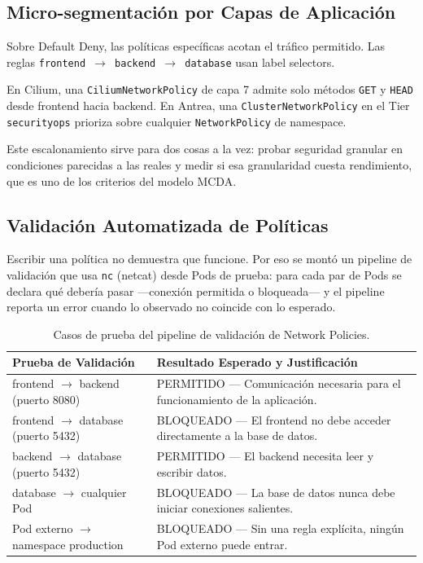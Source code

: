 \subsection{Micro-segmentación por Capas de Aplicación}

Sobre Default Deny, las políticas específicas acotan el tráfico permitido. Las reglas \texttt{frontend $\rightarrow$ backend $\rightarrow$ database} usan label selectors.

En Cilium, una \texttt{CiliumNetworkPolicy} de capa 7 admite solo métodos \texttt{GET} y \texttt{HEAD} desde frontend hacia backend. En Antrea, una \texttt{ClusterNetworkPolicy} en el Tier \texttt{securityops} prioriza sobre cualquier \texttt{NetworkPolicy} de namespace.

Este escalonamiento sirve para dos cosas a la vez: probar seguridad granular en condiciones parecidas a las reales y medir si esa granularidad cuesta rendimiento, que es uno de los criterios del modelo MCDA.

\subsection{Validación Automatizada de Políticas}

Escribir una política no demuestra que funcione. Por eso se montó un pipeline de validación que usa \texttt{nc} (netcat) desde Pods de prueba: para cada par de Pods se declara qué debería pasar ---conexión permitida o bloqueada--- y el pipeline reporta un error cuando lo observado no coincide con lo esperado.

\begin{table}[htbp]
\centering
\scriptsize
\renewcommand{\arraystretch}{1.25}
\setlength{\tabcolsep}{4pt}
\caption{Casos de prueba del pipeline de validación de Network Policies.}
\label{tab:validacion-network-policies}
\begin{tabularx}{\textwidth}{|p{5cm}|Y|}
\hline
\textbf{Prueba de Validación} & \textbf{Resultado Esperado y Justificación} \\
\hline
frontend $\rightarrow$ backend (puerto 8080) & PERMITIDO --- Comunicación necesaria para el funcionamiento de la aplicación. \\
\hline
frontend $\rightarrow$ database (puerto 5432) & BLOQUEADO --- El frontend no debe acceder directamente a la base de datos. \\
\hline
backend $\rightarrow$ database (puerto 5432) & PERMITIDO --- El backend necesita leer y escribir datos. \\
\hline
database $\rightarrow$ cualquier Pod & BLOQUEADO --- La base de datos nunca debe iniciar conexiones salientes. \\
\hline
Pod externo $\rightarrow$ namespace production & BLOQUEADO --- Sin una regla explícita, ningún Pod externo puede entrar. \\
\hline
\end{tabularx}
\end{table}

